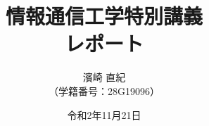 \documentclass[a4paper]{jsarticle}
\title{\Huge 情報通信工学特別講義\\\huge レポート\vspace{120mm}}
\author{\Large 濱崎 直紀\\\large （学籍番号：28G19096）\vspace{25mm}}
\date{令和2年11月21日}
\begin{document}
\begin{titlepage}
\maketitle
\thispagestyle{empty}
\end{titlepage}

\pagestyle{empty}


\end{document}
